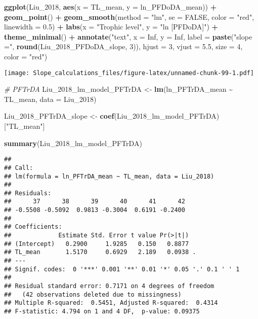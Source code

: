 \documentclass[
]{article}
\newenvironment{Shaded}{\begin{snugshade}}{\end{snugshade}}
\newcommand{\AttributeTok}[1]{\textcolor[rgb]{0.13,0.29,0.53}{#1}}
\newcommand{\CommentTok}[1]{\textcolor[rgb]{0.56,0.35,0.01}{\textit{#1}}}
\newcommand{\ConstantTok}[1]{\textcolor[rgb]{0.56,0.35,0.01}{#1}}
\newcommand{\DecValTok}[1]{\textcolor[rgb]{0.00,0.00,0.81}{#1}}
\newcommand{\FloatTok}[1]{\textcolor[rgb]{0.00,0.00,0.81}{#1}}
\newcommand{\FunctionTok}[1]{\textcolor[rgb]{0.13,0.29,0.53}{\textbf{#1}}}
\newcommand{\NormalTok}[1]{#1}
\newcommand{\OtherTok}[1]{\textcolor[rgb]{0.56,0.35,0.01}{#1}}
\newcommand{\SpecialCharTok}[1]{\textcolor[rgb]{0.81,0.36,0.00}{\textbf{#1}}}
\newcommand{\StringTok}[1]{\textcolor[rgb]{0.31,0.60,0.02}{#1}}
\begin{document}
\begin{Shaded}
\begin{Highlighting}[]
\FunctionTok{ggplot}\NormalTok{(Liu\_2018, }\FunctionTok{aes}\NormalTok{(}\AttributeTok{x =}\NormalTok{ TL\_mean, }\AttributeTok{y =}\NormalTok{ ln\_PFDoDA\_mean)) }\SpecialCharTok{+}
  \FunctionTok{geom\_point}\NormalTok{() }\SpecialCharTok{+}
  \FunctionTok{geom\_smooth}\NormalTok{(}\AttributeTok{method =} \StringTok{"lm"}\NormalTok{, }\AttributeTok{se =} \ConstantTok{FALSE}\NormalTok{, }\AttributeTok{color =} \StringTok{"red"}\NormalTok{, }\AttributeTok{linewidth =} \FloatTok{0.5}\NormalTok{) }\SpecialCharTok{+}
  \FunctionTok{labs}\NormalTok{(}\AttributeTok{x =} \StringTok{"Trophic level"}\NormalTok{,}
       \AttributeTok{y =} \StringTok{"ln [PFDoDA]"}\NormalTok{) }\SpecialCharTok{+}
  \FunctionTok{theme\_minimal}\NormalTok{() }\SpecialCharTok{+}
  \FunctionTok{annotate}\NormalTok{(}\StringTok{"text"}\NormalTok{, }\AttributeTok{x =} \ConstantTok{Inf}\NormalTok{, }\AttributeTok{y =} \ConstantTok{Inf}\NormalTok{, }\AttributeTok{label =} \FunctionTok{paste}\NormalTok{(}\StringTok{"slope ="}\NormalTok{, }\FunctionTok{round}\NormalTok{(Liu\_2018\_PFDoDA\_slope, }\DecValTok{3}\NormalTok{)), }
           \AttributeTok{hjust =} \DecValTok{3}\NormalTok{, }\AttributeTok{vjust =} \FloatTok{5.5}\NormalTok{, }\AttributeTok{size =} \DecValTok{4}\NormalTok{, }\AttributeTok{color =} \StringTok{"red"}\NormalTok{)}
\end{Highlighting}
\end{Shaded}

\texttt{[image: Slope\_calculations\_files/figure-latex/unnamed-chunk-99-1.pdf]}

\begin{Shaded}
\begin{Highlighting}[]
\CommentTok{\# PFTrDA }
\NormalTok{Liu\_2018\_lm\_model\_PFTrDA }\OtherTok{\textless{}{-}} \FunctionTok{lm}\NormalTok{(ln\_PFTrDA\_mean }\SpecialCharTok{\textasciitilde{}}\NormalTok{ TL\_mean,}
                             \AttributeTok{data =}\NormalTok{ Liu\_2018)}

\NormalTok{Liu\_2018\_PFTrDA\_slope }\OtherTok{\textless{}{-}} \FunctionTok{coef}\NormalTok{(Liu\_2018\_lm\_model\_PFTrDA)[}\StringTok{"TL\_mean"}\NormalTok{]}

\FunctionTok{summary}\NormalTok{(Liu\_2018\_lm\_model\_PFTrDA)}
\end{Highlighting}
\end{Shaded}

\begin{verbatim}
## 
## Call:
## lm(formula = ln_PFTrDA_mean ~ TL_mean, data = Liu_2018)
## 
## Residuals:
##      37      38      39      40      41      42 
## -0.5508 -0.5092  0.9813 -0.3004  0.6191 -0.2400 
## 
## Coefficients:
##             Estimate Std. Error t value Pr(>|t|)  
## (Intercept)   0.2900     1.9285   0.150   0.8877  
## TL_mean       1.5170     0.6929   2.189   0.0938 .
## ---
## Signif. codes:  0 '***' 0.001 '**' 0.01 '*' 0.05 '.' 0.1 ' ' 1
## 
## Residual standard error: 0.7171 on 4 degrees of freedom
##   (42 observations deleted due to missingness)
## Multiple R-squared:  0.5451, Adjusted R-squared:  0.4314 
## F-statistic: 4.794 on 1 and 4 DF,  p-value: 0.09375
\end{verbatim}
\end{document}
